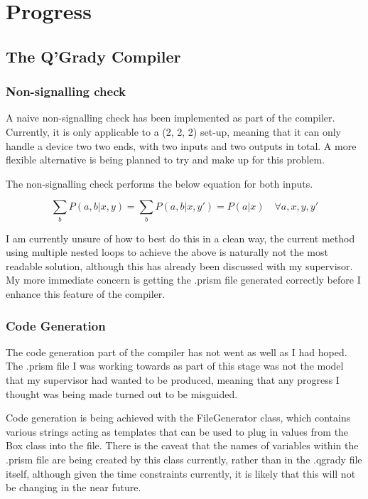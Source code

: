 \documentclass[report.tex]{subfiles}
\begin{document}
\section{Progress} %
\label{cha:progress}

\subsection{The Q'Grady Compiler} %
\label{sub:the_q_grady_compiler}
\subsubsection{Non-signalling check} %
\label{sub:non_signalling_check}
A naive non-signalling check has been implemented as part of the compiler.
Currently, it is only applicable to a (2, 2, 2) set-up, meaning that it can only
handle a device two two ends, with two inputs and two outputs in total. A more
flexible alternative is being planned to try and make up for this problem.

The non-signalling check performs the below equation for both inputs. 

\[\sum_{b} P(a, b | x, y) = \sum_{b} P(a, b | x, y') = P(a | x) 
\quad \forall a, x, y, y'\]

I am currently unsure of how to best do this in a clean way, the current method
using multiple nested loops to achieve the above is naturally not the most
readable solution, although this has already been discussed with my supervisor.
My more immediate concern is getting the .prism file generated correctly before
I enhance this feature of the compiler.

\subsubsection{Code Generation} %
\label{ssub:code_generation}
The code generation part of the compiler has not went as well as I had hoped.
The .prism file I was working towards as part of this stage was not the model
that my supervisor had wanted to be produced, meaning that any progress I
thought was being made turned out to be misguided.

Code generation is being achieved with the FileGenerator class, which contains
various strings acting as templates that can be used to plug in values from
the Box class into the file. There is the caveat that the names of variables
within the .prism file are being created by this class currently, rather than
in the .qgrady file itself, although given the time constraints currently, it is
likely that this will not be changing in the near future.
\end{document}
